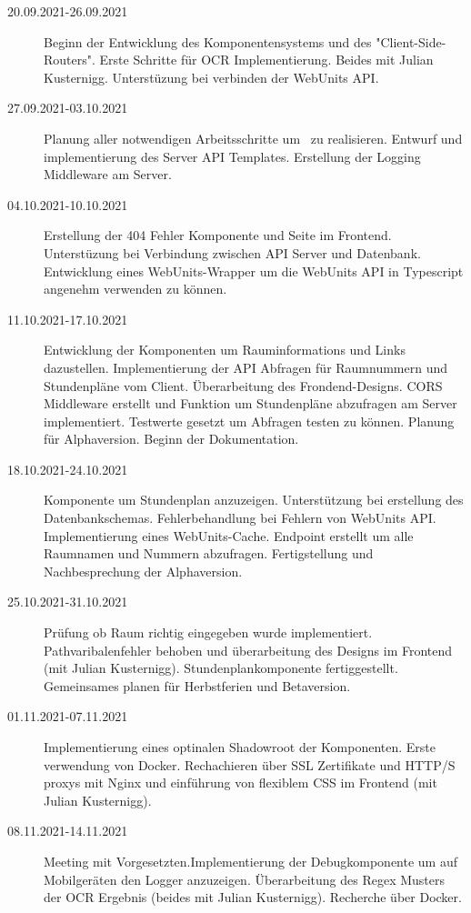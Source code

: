 
\begin{description}
    \item[20.09.2021-26.09.2021] Beginn der Entwicklung des Komponentensystems und des "Client-Side-Routers". Erste Schritte für OCR Implementierung. Beides mit Julian Kusternigg. Unterstüzung bei verbinden der WebUnits API.
    \item[27.09.2021-03.10.2021] Planung aller notwendigen Arbeitsschritte um \ZELIA\ zu realisieren. Entwurf und implementierung des Server API Templates. Erstellung der Logging Middleware am Server.
    \item[04.10.2021-10.10.2021] Erstellung der 404 Fehler Komponente und Seite im Frontend. Unterstüzung bei Verbindung zwischen API Server und Datenbank. Entwicklung eines WebUnits-Wrapper um die WebUnits API in Typescript angenehm verwenden zu können.
    \item[11.10.2021-17.10.2021] Entwicklung der Komponenten um Rauminformations und Links dazustellen. Implementierung der API Abfragen für Raumnummern und Stundenpläne vom Client. Überarbeitung des Frondend-Designs. CORS Middleware erstellt und Funktion um Stundenpläne abzufragen am Server implementiert. Testwerte gesetzt um Abfragen testen zu können. Planung für Alphaversion. Beginn der Dokumentation. 
    \item[18.10.2021-24.10.2021] Komponente um Stundenplan anzuzeigen. Unterstützung bei erstellung des Datenbankschemas. Fehlerbehandlung bei Fehlern von WebUnits API. Implementierung eines WebUnits-Cache. Endpoint erstellt um alle Raumnamen und Nummern abzufragen. Fertigstellung und Nachbesprechung der Alphaversion.
    \item[25.10.2021-31.10.2021] Prüfung ob Raum richtig eingegeben wurde implementiert. Pathvaribalenfehler behoben und überarbeitung des Designs im Frontend (mit Julian Kusternigg). Stundenplankomponente fertiggestellt. Gemeinsames planen für Herbstferien und Betaversion. 
    \item[01.11.2021-07.11.2021] Implementierung eines optinalen Shadowroot der Komponenten. Erste verwendung von Docker. Rechachieren über SSL Zertifikate und HTTP/S proxys mit Nginx und einführung von flexiblem CSS im Frontend (mit Julian Kusternigg).
    \item[08.11.2021-14.11.2021] Meeting mit Vorgesetzten.Implementierung der Debugkomponente um auf Mobilgeräten den Logger anzuzeigen. Überarbeitung des Regex Musters der OCR Ergebnis (beides mit Julian Kusternigg). Recherche über Docker.

\end{description}
